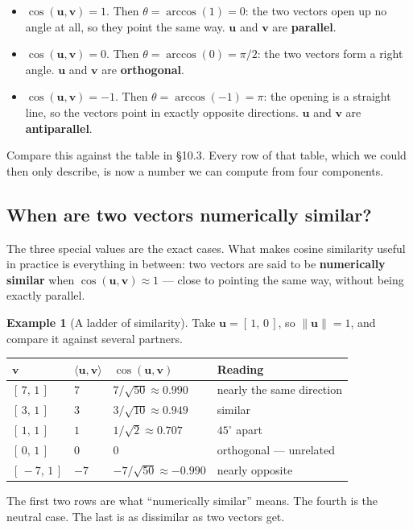 \documentclass[11pt]{article}
\theoremstyle{definition}
\newtheorem{ex}{Example}
\theoremstyle{remark}
\newcommand{\vc}[1]{\mathbf{#1}}
\newcommand{\norm}[1]{\lVert #1\rVert}
\begin{document}
\begin{itemize}[leftmargin=1.4em,itemsep=4pt]
  \item $\cos(\vc{u},\vc{v})=1$. Then $\theta=\arccos(1)=0$: the two vectors
        open up no angle at all, so they point the same way. $\vc{u}$ and
        $\vc{v}$ are \textbf{parallel}.
  \item $\cos(\vc{u},\vc{v})=0$. Then $\theta=\arccos(0)=\pi/2$: the two vectors
        form a right angle. $\vc{u}$ and $\vc{v}$ are \textbf{orthogonal}.
  \item $\cos(\vc{u},\vc{v})=-1$. Then $\theta=\arccos(-1)=\pi$: the opening is
        a straight line, so the vectors point in exactly opposite directions.
        $\vc{u}$ and $\vc{v}$ are \textbf{antiparallel}.
\end{itemize}

\noindent Compare this against the table in \S10.3. Every row of that table,
which we could then only describe, is now a number we can compute from four
components.

\subsection{When are two vectors numerically similar?}
The three special values are the exact cases. What makes cosine similarity
useful in practice is everything in between: two vectors are said to be
\textbf{numerically similar} when $\cos(\vc{u},\vc{v})\approx 1$ --- close to
pointing the same way, without being exactly parallel.

\begin{ex}[A ladder of similarity]
Take $\vc{u}=[\,1,\,0\,]$, so $\norm{\vc{u}}=1$, and compare it against
several partners.
\begin{center}
\renewcommand{\arraystretch}{1.35}
\begin{tabular}{@{}l l l l@{}}
\toprule
$\vc{v}$ & $\langle\vc{u},\vc{v}\rangle$ & $\cos(\vc{u},\vc{v})$ & \textbf{Reading} \\
\midrule
$[\,7,\,1\,]$   & $7$   & $7/\sqrt{50}\approx 0.990$   & nearly the same direction \\
$[\,3,\,1\,]$   & $3$   & $3/\sqrt{10}\approx 0.949$   & similar \\
$[\,1,\,1\,]$   & $1$   & $1/\sqrt{2}\approx 0.707$    & $45^{\circ}$ apart \\
$[\,0,\,1\,]$   & $0$   & $0$                          & orthogonal --- unrelated \\
$[\,-7,\,1\,]$  & $-7$  & $-7/\sqrt{50}\approx -0.990$ & nearly opposite \\
\bottomrule
\end{tabular}
\end{center}
The first two rows are what ``numerically similar'' means. The fourth is the
neutral case. The last is as dissimilar as two vectors get.
\end{ex}
\end{document}
